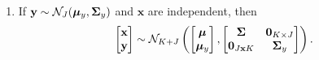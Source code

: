 \begin{theorem}
\begin{enumerate}
        \item
            If $\mathbf{y} \sim \mathcal{N}_J( \boldsymbol{\mu}_y, \boldsymbol{\Sigma}_{y})$ and $\mathbf{x}$ are independent, then
            \begin{equation*}
                \begin{bmatrix}
                    \mathbf{x} \\
                    \mathbf{y}
                \end{bmatrix}
                \sim \mathcal{N}_{K + J} \left(
                \begin{bmatrix}
                        \boldsymbol{\mu} \\
                        \boldsymbol{\mu}_{y}
                    \end{bmatrix}
                ,
                \begin{bmatrix}
                        \boldsymbol{\Sigma} & \mathbf{0}_{K \times J} \\
                        \mathbf{0}_{J \mathbf{x}
                        K} & \boldsymbol{\Sigma}_y
                    \end{bmatrix}
                \right).
            \end{equation*}
    \end{enumerate}
\end{theorem}
